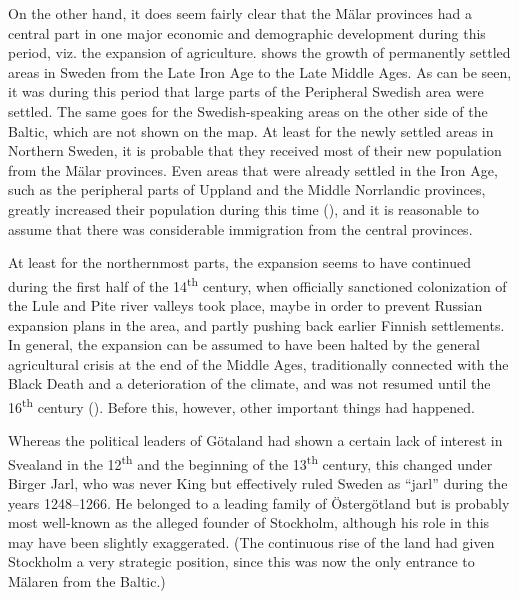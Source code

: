 On the other hand, it does seem fairly clear that the Mälar provinces had a central part in one major economic and demographic development during this period, viz. the expansion of agriculture.  shows the growth of permanently settled areas in Sweden from the Late Iron Age to the Late Middle Ages. As can be seen, it was during this period that large parts of the Peripheral Swedish area were settled. The same goes for the Swedish-speaking areas on the other side of the Baltic, which are not shown on the map. At least for the newly settled areas in Northern Sweden, it is probable that they received most of their new population from the Mälar provinces. Even areas that were already settled in the Iron Age, such as the peripheral parts of Uppland and the Middle Norrlandic provinces, greatly increased their population during this time (\citealt{Broberg1990}), and it is reasonable to assume that there was considerable immigration from the central provinces. 

At least for the northernmost parts, the expansion seems to have continued during the first half of the 14\textsuperscript{th} century, when officially sanctioned colonization of the Lule and Pite river valleys took place, maybe in order to prevent Russian expansion plans in the area, and partly pushing back earlier Finnish settlements. In general, the expansion can be assumed to have been halted by the general agricultural crisis at the end of the Middle Ages, traditionally connected with the Black Death and a deterioration of the climate, and was not resumed until the 16\textsuperscript{th} century (\citealt[248]{Myrdal2003}). Before this, however, other important things had happened.

Whereas the political leaders of Götaland had shown a certain lack of interest in Svealand in the 12\textsuperscript{th} and the beginning of the 13\textsuperscript{th} century, this changed under Birger Jarl, who was never King but effectively ruled Sweden as “jarl” during the years 1248--1266. He belonged to a leading family of Östergötland but is probably most well-known as the alleged founder of Stockholm, although his role in this may have been slightly exaggerated. (The continuous rise of the land had given Stockholm a very strategic position, since this was now the only entrance to Mälaren from the Baltic.)

